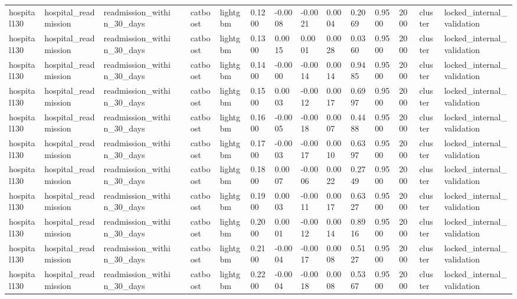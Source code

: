 \begin{tabular}{lllllllllllllll}
hospital130 & hospital\_readmission & readmission\_within\_30\_days &  & catboost & lightgbm & 0.1200 & -0.0008 & -0.0021 & 0.0004 & 0.2069 & 0.9500 & 2000 & cluster & locked\_internal\_validation \\
hospital130 & hospital\_readmission & readmission\_within\_30\_days &  & catboost & lightgbm & 0.1300 & 0.0015 & 0.0001 & 0.0028 & 0.0360 & 0.9500 & 2000 & cluster & locked\_internal\_validation \\
hospital130 & hospital\_readmission & readmission\_within\_30\_days &  & catboost & lightgbm & 0.1400 & -0.0000 & -0.0014 & 0.0014 & 0.9485 & 0.9500 & 2000 & cluster & locked\_internal\_validation \\
hospital130 & hospital\_readmission & readmission\_within\_30\_days &  & catboost & lightgbm & 0.1500 & 0.0003 & -0.0012 & 0.0017 & 0.6997 & 0.9500 & 2000 & cluster & locked\_internal\_validation \\
hospital130 & hospital\_readmission & readmission\_within\_30\_days &  & catboost & lightgbm & 0.1600 & -0.0005 & -0.0018 & 0.0007 & 0.4488 & 0.9500 & 2000 & cluster & locked\_internal\_validation \\
hospital130 & hospital\_readmission & readmission\_within\_30\_days &  & catboost & lightgbm & 0.1700 & -0.0003 & -0.0017 & 0.0010 & 0.6397 & 0.9500 & 2000 & cluster & locked\_internal\_validation \\
hospital130 & hospital\_readmission & readmission\_within\_30\_days &  & catboost & lightgbm & 0.1800 & 0.0007 & -0.0006 & 0.0022 & 0.2749 & 0.9500 & 2000 & cluster & locked\_internal\_validation \\
hospital130 & hospital\_readmission & readmission\_within\_30\_days &  & catboost & lightgbm & 0.1900 & 0.0003 & -0.0011 & 0.0017 & 0.6327 & 0.9500 & 2000 & cluster & locked\_internal\_validation \\
hospital130 & hospital\_readmission & readmission\_within\_30\_days &  & catboost & lightgbm & 0.2000 & 0.0001 & -0.0012 & 0.0014 & 0.8916 & 0.9500 & 2000 & cluster & locked\_internal\_validation \\
hospital130 & hospital\_readmission & readmission\_within\_30\_days &  & catboost & lightgbm & 0.2100 & -0.0004 & -0.0017 & 0.0008 & 0.5127 & 0.9500 & 2000 & cluster & locked\_internal\_validation \\
hospital130 & hospital\_readmission & readmission\_within\_30\_days &  & catboost & lightgbm & 0.2200 & -0.0004 & -0.0018 & 0.0008 & 0.5367 & 0.9500 & 2000 & cluster & locked\_internal\_validation \\

\end{tabular}
